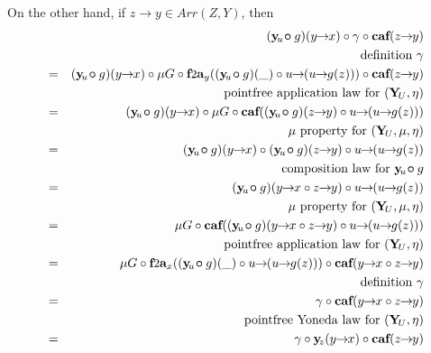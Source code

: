 \documentclass[journal]{journal}
\newcommand{\bcirc}{\bm{\circ}}
\def\edefn{\endgroup\par\pagebreak[2]\addvspace{\medskipamount}}
\let\eprf=\edefn
\newcommand{\arrow}[2]{#1\!\!\rightarrow\!\!#2}
\newcommand{\cfta}[1]{\mbox{{\normalsize {\bf f}}{\small 2}{\normalsize {\bf a}}}_{#1}}
\newcommand{\Y}{\mbox{\bf Y}}
\newcommand{\y}{\mbox{\bf y}}
\newcommand{\caf}{\mbox{\bf caf}}
\begin{document}
On the other hand, if $\arrow{z}{y} \in Arr(Z,Y)$, then
\begin{eqnarray*}
&   & \!\!\!\!\!\!\!\!\!\!\!\!\!\!\!\! (\y\!_{u} \!\bcirc g)(\arrow{y}{x}) \circ \gamma \circ \caf(\arrow{z}{y}) \\
&   & \mbox{definition } \gamma \\
& = & (\y\!_{u} \!\bcirc g)(\arrow{y}{x}) \circ \mu G \circ \cfta{y}((\y\!_{u} \!\bcirc g)(\_) \circ \arrow{u}{(\arrow{u}{g(z)})}) \circ \caf(\arrow{z}{y}) \\
&   & \mbox{pointfree application law for } (\Y\!_U, \eta) \\      
& = & (\y\!_{u} \!\bcirc g)(\arrow{y}{x}) \circ \mu G \circ \caf((\y\!_{u} \!\bcirc g)(\arrow{z}{y}) \circ \arrow{u}{(\arrow{u}{g(z)})}) \\
&   & \mu \mbox{ property for } (\Y\!_U, \mu, \eta) \\      
& = & (\y\!_{u} \!\bcirc g)(\arrow{y}{x}) \circ (\y\!_{u} \!\bcirc g)(\arrow{z}{y}) \circ \arrow{u}{(\arrow{u}{g(z)})} \\
&   & \mbox{composition law for } \y\!_{u} \!\bcirc g \\
& = & (\y\!_{u} \!\bcirc g)(\arrow{y}{x} \circ \arrow{z}{y}) \circ \arrow{u}{(\arrow{u}{g(z)})} \\  
&   & \mu \mbox{ property for } (\Y\!_U, \mu, \eta) \\      
& = & \mu G \circ \caf((\y\!_{u} \!\bcirc g)(\arrow{y}{x} \circ \arrow{z}{y}) \circ \arrow{u}{(\arrow{u}{g(z)})}) \\  
&   & \mbox{pointfree application law for } (\Y\!_U, \eta) \\      
& = & \mu G \circ \cfta{x}((\y\!_{u} \!\bcirc g)(\_) \circ \arrow{u}{(\arrow{u}{g(z)})}) \circ \caf(\arrow{y}{x} \circ \arrow{z}{y}) \\  
&   & \mbox{definition } \gamma \\
& = & \gamma \circ \caf(\arrow{y}{x} \circ \arrow{z}{y}) \\  
&   & \mbox{pointfree Yoneda law for } (\Y\!_U, \eta) \\      
& = & \gamma \circ \y\!_{z}(\arrow{y}{x}) \circ \caf(\arrow{z}{y}) 
\end{eqnarray*}
\eprf
\end{document}
